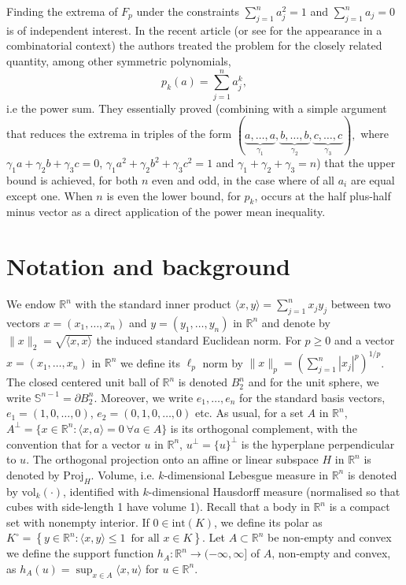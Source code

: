 \documentclass[10pt]{amsart}
\newcommand{\ls}{\leqslant}
\newcommand{\gr}{\geqslant}
\newcommand{\1}{\textbf{1}}
\numberwithin{equation}{section} %
\theoremstyle{remark}
\theoremstyle{definition}
\begin{document}
Finding the extrema of $F_p$ under the constraints $\sum_{j=1}^na_j^2=1$ and $\sum_{j=1}^n a_j=0$ is of independent interest. In the recent article \cite{brazitikos2025sharp} (or see \cite{rivin2002counting} for the appearance in a combinatorial context)  the authors treated the problem for the closely related quantity, among other symmetric polynomials, 
\[
p_k(a)=\sum_{j=1}^na_j^k,
\]
i.e the power sum. They essentially proved (combining with a simple argument that reduces the extrema in triples of the form $\left(\underbrace{a,\ldots,a}_{\gamma_1},\underbrace{b,\ldots,b}_{\gamma_2},\underbrace{c,\ldots,c}_{\gamma_3} \right),$ where $\gamma_1a+\gamma_2b+\gamma_3c=0$, $\gamma_1a^2+\gamma_2b^2+\gamma_3c^2=1$ and $\gamma_1+\gamma_2+\gamma_3=n$) that the upper bound is achieved, for both $n$ even and odd, in the case where of all $a_i$ are  equal except one. When $n$ is even the lower bound, for $p_k$, occurs at the half plus-half minus vector as a direct application of the power mean inequality.

\section{Notation and background}\label{Notation and Background}
We endow $\mathbb{R}^n$ with the standard inner product $\langle x, y \rangle = \sum_{j=1}^n x_j y_j$ between two vectors $x = (x_1, \ldots, x_n)$ and $y = (y_1, \ldots, y_n)$ in $\mathbb{R}^n$ and denote by $\|x\|_2 = \sqrt{\langle x, x \rangle}$ the induced standard Euclidean norm. For $p\gr0$ and a vector $x=(x_1,\ldots,x_n)$ in $\mathbb{R}^n$ we define its $\ell_p$ norm by $\|x\|_p=\left(\sum_{j=1}^n|x_j|^p \right)^{1/p}$. The closed centered unit ball of $\mathbb{R}^n$ is denoted $B^n_2$ and for the unit sphere, we write $\mathbb{S}^{n-1} = \partial B^n_2$. 
Moreover, we write $e_1, \ldots, e_n$ for the standard basis vectors, $e_1 = (1, 0, \ldots, 0)$, $e_2 = (0, 1, 0, \ldots, 0)$ etc. As usual, for a set $A$ in $\mathbb{R}^n$, $A^\perp = \{ x \in \mathbb{R}^n : \langle x, a \rangle = 0 \ \forall a \in A \}$ is its orthogonal complement, with the convention that for a vector $u$ in $\mathbb{R}^n$, $u^\perp = \{u\}^\perp$ is the hyperplane perpendicular to $u$. The orthogonal projection onto an affine or linear subspace $H$ in $\mathbb{R}^n$ is denoted by $\text{Proj}_H$. Volume, i.e. $k$-dimensional Lebesgue measure in $\mathbb{R}^n$ is denoted by $\text{vol}_k(\cdot)$, identified with $k$-dimensional Hausdorff measure (normalised so that cubes with side-length 1 have volume 1).  Recall that a body in $\mathbb{R}^n$ is a compact set with nonempty interior.  If $0\in \text{int}(K)$, we define its polar as  $K^{\circ}= \left \{ y \in \mathbb{R}^n: \langle x,y \rangle  \ls 1 \,\,\, \text{for all $x \in K$}\right \}.$  Let $A\subset \mathbb{R}^n$ be non-empty and convex we define the support function $h_A:\mathbb{R}^n\rightarrow (-\infty,\infty]$ of $A$, non-empty and convex,  as $h_A(u)=\sup_{x\in A}  \langle x,u \rangle$ for $u\in \mathbb{R}^{n}$.
\end{document}
